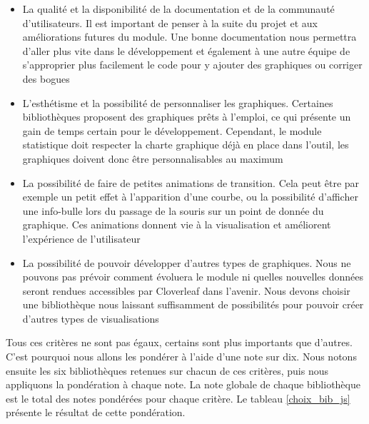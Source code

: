 			\begin{itemize}
			  \item La qualité et la disponibilité de la documentation et de la
			  communauté d'utilisateurs. Il est important de penser à la suite du projet
			  et aux améliorations futures du module. Une bonne documentation nous
			  permettra d'aller plus vite dans le développement et également à une autre
			  équipe de s'approprier plus facilement le code pour y
			  ajouter des graphiques ou corriger des bogues
			  \item L'esthétisme et la possibilité de personnaliser les graphiques.
			  Certaines bibliothèques proposent des graphiques prêts à l'emploi, ce qui
			  présente un gain de temps certain pour le développement. Cependant, le module
			  statistique doit respecter la charte graphique déjà en place dans l'outil,
			  les graphiques doivent donc être personnalisables au maximum
			  \item La possibilité de faire de petites animations de transition. Cela
			  peut être par exemple un petit effet à l'apparition d'une courbe, ou la
			  possibilité d'afficher une info-bulle lors du passage de la souris sur un
			  point de donnée du graphique. Ces animations donnent vie à la visualisation
			  et améliorent l'expérience de l'utilisateur
			  \item La possibilité de pouvoir développer d'autres types de graphiques.
			  Nous ne pouvons pas prévoir comment évoluera le module ni quelles nouvelles
			  données seront rendues accessibles par Cloverleaf dans l'avenir. Nous
			  devons choisir une bibliothèque nous laissant suffisamment de possibilités pour
			  pouvoir créer d'autres types de visualisations
			\end{itemize}
			Tous ces critères ne sont pas égaux, certains sont plus importants que
			d'autres. C'est pourquoi nous allons les pondérer à l'aide d'une note sur
			dix. Nous notons ensuite les six bibliothèques retenues sur chacun de ces
			critères, puis nous appliquons la pondération à chaque note. La note globale
			de chaque bibliothèque est le total des notes pondérées pour chaque critère.
			Le tableau \ref{choix_bib_js} présente le résultat de cette pondération.
